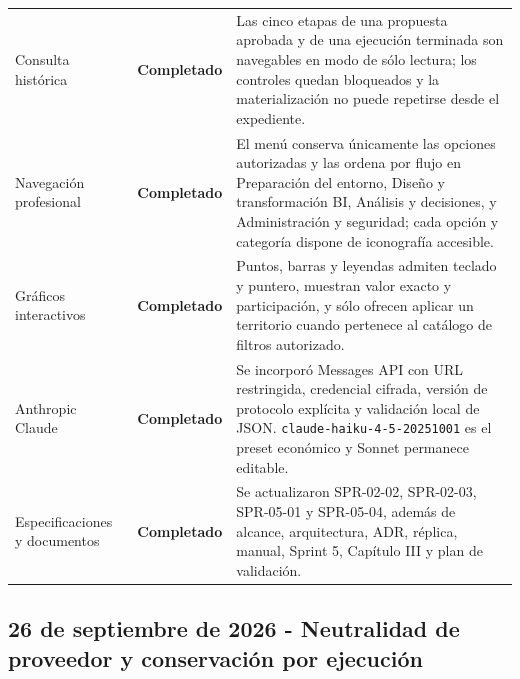 \documentclass[11pt,letterpaper]{article}
\newcommand{\statusok}{\textcolor{deepgreen}{\textbf{Completado}}}
\newcommand{\file}[1]{\texttt{#1}}
\begin{document}
\begin{longtable}{@{}p{}p{}p{}@{}}
  Consulta histórica & \statusok & Las cinco etapas de una propuesta aprobada y de una ejecución terminada son navegables en modo de sólo lectura; los controles quedan bloqueados y la materialización no puede repetirse desde el expediente. \\
  Navegación profesional & \statusok & El menú conserva únicamente las opciones autorizadas y las ordena por flujo en Preparación del entorno, Diseño y transformación BI, Análisis y decisiones, y Administración y seguridad; cada opción y categoría dispone de iconografía accesible. \\
  Gráficos interactivos & \statusok & Puntos, barras y leyendas admiten teclado y puntero, muestran valor exacto y participación, y sólo ofrecen aplicar un territorio cuando pertenece al catálogo de filtros autorizado. \\
  Anthropic Claude & \statusok & Se incorporó Messages API con URL restringida, credencial cifrada, versión de protocolo explícita y validación local de JSON. \file{claude-haiku-4-5-20251001} es el preset económico y Sonnet permanece editable. \\
  Especificaciones y documentos & \statusok & Se actualizaron SPR-02-02, SPR-02-03, SPR-05-01 y SPR-05-04, además de alcance, arquitectura, ADR, réplica, manual, Sprint 5, Capítulo III y plan de validación. \\
  \bottomrule
\end{longtable}

\clearpage
\subsection{26 de septiembre de 2026 - Neutralidad de proveedor y conservación por ejecución}
\end{document}
